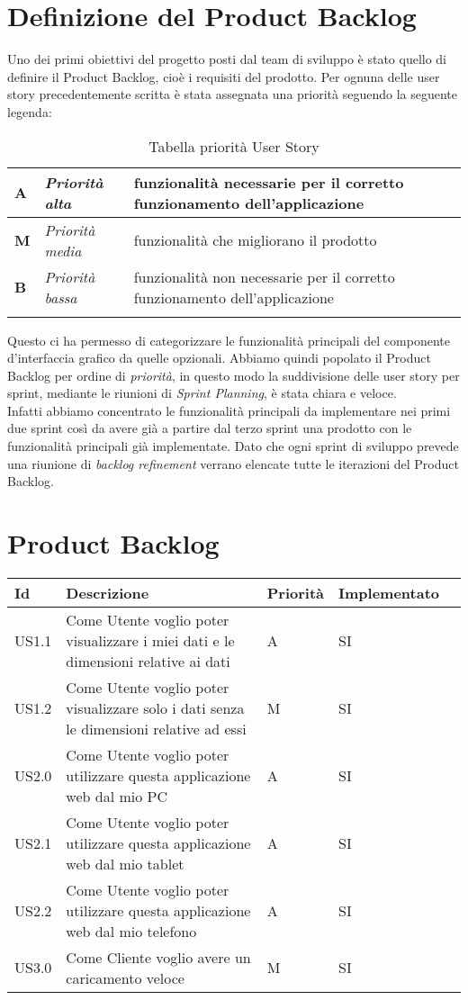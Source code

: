 \section{Definizione del Product Backlog}
Uno dei primi obiettivi del progetto posti dal team di sviluppo è stato quello di definire il Product Backlog, cioè i requisiti del prodotto. Per ognuna delle user story precedentemente scritta è stata assegnata una priorità seguendo la seguente legenda:
\begin{longtable} {
		|>{\centering}p{10mm}| 
		|>{}p{25mm}|
		|>{}p{85mm}|
		>{}p{0mm}}
	\hline
	\textbf{A} & \textit{Priorità alta}  & funzionalità necessarie per il corretto funzionamento dell'applicazione \\ \hline
	\textbf{M} & \textit{Priorità media} & funzionalità che migliorano il prodotto \\ \hline
	\textbf{B} & \textit{Priorità bassa} & funzionalità non necessarie per il corretto funzionamento dell'applicazione \\ \hline
	\hline
	\caption{Tabella priorità User Story}
\end{longtable}
\noindent
Questo ci ha permesso di categorizzare le funzionalità principali del componente d'interfaccia grafico da quelle opzionali. Abbiamo quindi popolato il Product Backlog per ordine di \textit{priorità}, in questo modo la suddivisione delle user story per sprint, mediante le riunioni di \textit{Sprint Planning}, è stata chiara e veloce. \\
Infatti abbiamo concentrato le funzionalità principali da implementare nei primi due sprint così da avere già a partire dal terzo sprint una prodotto con le funzionalità principali già implementate. Dato che ogni sprint di sviluppo prevede una riunione di \emph{backlog refinement} verrano elencate tutte le iterazioni del Product Backlog.


\section{Product Backlog}
\begin{longtable} {
		|>{}p{10mm}| 
		|>{}p{70mm}|
		|>{}p{15mm}|
		|>{}p{25mm}|
		>{}p{0mm}}
	\hline
	\textbf{Id} & \textbf{Descrizione} & \textbf{Priorità} & \textbf{Implementato} \\ \hline
	US1.1 & Come Utente voglio poter visualizzare i miei dati e le dimensioni relative ai dati & A & SI \\ \hline
	US1.2 & Come Utente voglio poter visualizzare solo i dati senza le dimensioni relative ad essi & M & SI \\ \hline
	US2.0 & Come Utente voglio poter utilizzare questa applicazione web dal mio PC & A & SI \\ \hline
	US2.1 & Come Utente voglio poter utilizzare questa applicazione web dal mio tablet & A & SI \\ \hline
	US2.2 & Come Utente voglio poter utilizzare questa applicazione web dal mio telefono & A & SI \\ \hline
	US3.0 & Come Cliente voglio avere un caricamento veloce & M & SI \\ \hline
\end{longtable}
\newpage
